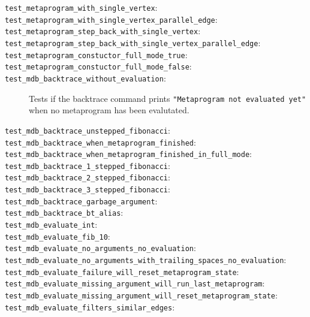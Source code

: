 \begin{description}
    \item[\texttt{test\_metaprogram\_with\_single\_vertex}:]
    \item[\texttt{test\_metaprogram\_with\_single\_vertex\_parallel\_edge}:]
    \item[\texttt{test\_metaprogram\_step\_back\_with\_single\_vertex}:]
    \item[\texttt{test\_metaprogram\_step\_back\_with\_single\_vertex\_parallel\_edge}:]
    \item[\texttt{test\_metaprogram\_constuctor\_full\_mode\_true}:]
    \item[\texttt{test\_metaprogram\_constuctor\_full\_mode\_false}:]
    \item[\texttt{test\_mdb\_backtrace\_without\_evaluation}:]
        Tests if the backtrace command prints
        \texttt{"Metaprogram not evaluated yet"} when no metaprogram has been
        evalutated.
    \item[\texttt{test\_mdb\_backtrace\_unstepped\_fibonacci}:]
    \item[\texttt{test\_mdb\_backtrace\_when\_metaprogram\_finished}:]
    \item[\texttt{test\_mdb\_backtrace\_when\_metaprogram\_finished\_in\_full\_mode}:]
    \item[\texttt{test\_mdb\_backtrace\_1\_stepped\_fibonacci}:]
    \item[\texttt{test\_mdb\_backtrace\_2\_stepped\_fibonacci}:]
    \item[\texttt{test\_mdb\_backtrace\_3\_stepped\_fibonacci}:]
    \item[\texttt{test\_mdb\_backtrace\_garbage\_argument}:]
    \item[\texttt{test\_mdb\_backtrace\_bt\_alias}:]
    \item[\texttt{test\_mdb\_evaluate\_int}:]
    \item[\texttt{test\_mdb\_evaluate\_fib\_10}:]
    \item[\texttt{test\_mdb\_evaluate\_no\_arguments\_no\_evaluation}:]
    \item[\texttt{test\_mdb\_evaluate\_no\_arguments\_with\_trailing\_spaces\_no\_evaluation}:]
    \item[\texttt{test\_mdb\_evaluate\_failure\_will\_reset\_metaprogram\_state}:]
    \item[\texttt{test\_mdb\_evaluate\_missing\_argument\_will\_run\_last\_metaprogram}:]
    \item[\texttt{test\_mdb\_evaluate\_missing\_argument\_will\_reset\_metaprogram\_state}:]
    \item[\texttt{test\_mdb\_evaluate\_filters\_similar\_edges}:]

\end{description}
